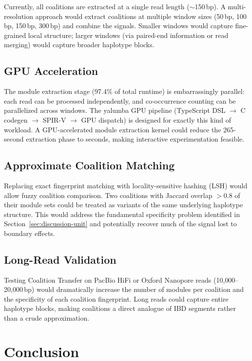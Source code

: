 \documentclass{../yalumba}
\begin{document}
Currently, all coalitions are extracted at a single read length ($\sim$150\,bp).
A multi-resolution approach would extract coalitions at multiple window sizes
(50\,bp, 100\,bp, 150\,bp, 300\,bp) and combine the signals.  Smaller windows
would capture fine-grained local structure; larger windows (via paired-end
information or read merging) would capture broader haplotype blocks.

\subsection{GPU Acceleration}

The module extraction stage (97.4\% of total runtime) is embarrassingly
parallel: each read can be processed independently, and co-occurrence
counting can be parallelized across windows.  The yalumba GPU pipeline
(TypeScript DSL $\to$ C codegen $\to$ SPIR-V $\to$ GPU dispatch) is designed
for exactly this kind of workload.  A GPU-accelerated module extraction
kernel could reduce the 265-second extraction phase to seconds, making
interactive experimentation feasible.

\subsection{Approximate Coalition Matching}

Replacing exact fingerprint matching with locality-sensitive hashing (LSH)
would allow fuzzy coalition comparison.  Two coalitions with Jaccard overlap
$> 0.8$ of their module sets could be treated as variants of the same
underlying haplotype structure.  This would address the fundamental
specificity problem identified in Section~\ref{sec:discussion-unit} and
potentially recover much of the signal lost to boundary effects.

\subsection{Long-Read Validation}

Testing Coalition Transfer on PacBio HiFi or Oxford Nanopore reads
(10{,}000--20{,}000\,bp) would dramatically increase the number of modules
per coalition and the specificity of each coalition fingerprint.  Long reads
could capture entire haplotype blocks, making coalitions a direct analogue
of IBD segments rather than a crude approximation.


\section{Conclusion}
\label{sec:conclusion}
\end{document}
